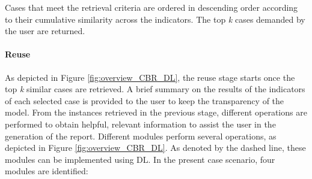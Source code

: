 Cases that meet the retrieval criteria are ordered in descending order according to their cumulative similarity across the indicators. The top \textit{k} cases demanded by the user are returned.

\paragraph{Reuse}\label{5_sec:dl_powered_cbr_reuse}
As depicted in Figure \ref{fig:overview_CBR_DL}, the reuse stage starts once the top \textit{k} similar cases are retrieved. A brief summary on the results of the indicators of each selected case is provided to the user to keep the transparency of the model. From the instances retrieved in the previous stage, different operations are performed to obtain helpful, relevant information to assist the user in the generation of the report. Different modules perform several operations, as depicted in Figure \ref{fig:overview_CBR_DL}. As denoted by the dashed line, these modules can be implemented using DL. In the present case scenario, four modules are identified:
